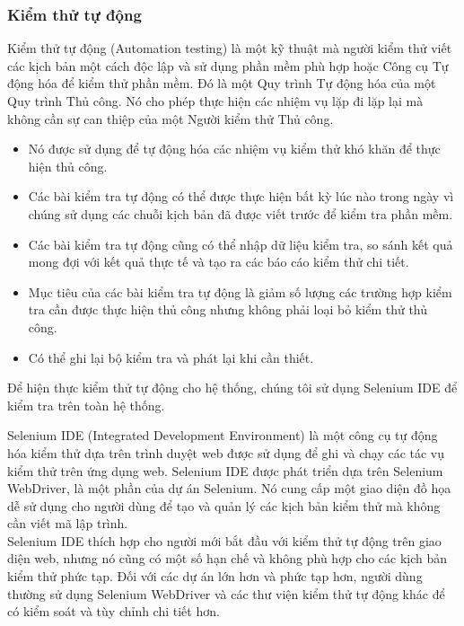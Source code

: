 \subsubsection{Kiểm thử tự động}

Kiểm thử tự động (Automation testing) là một kỹ thuật mà người kiểm thử viết các kịch bản một cách độc lập và sử dụng phần mềm phù hợp hoặc Công cụ Tự động hóa để kiểm thử phần mềm. Đó là một Quy trình Tự động hóa của một Quy trình Thủ công. Nó cho phép thực hiện các nhiệm vụ lặp đi lặp lại mà không cần sự can thiệp của một Người kiểm thử Thủ công.

\begin{itemize}
    \item Nó được sử dụng để tự động hóa các nhiệm vụ kiểm thử khó khăn để thực hiện thủ công.
    \item Các bài kiểm tra tự động có thể được thực hiện bất kỳ lúc nào trong ngày vì chúng sử dụng các chuỗi kịch bản đã được viết trước để kiểm tra phần mềm.
    \item Các bài kiểm tra tự động cũng có thể nhập dữ liệu kiểm tra, so sánh kết quả mong đợi với kết quả thực tế và tạo ra các báo cáo kiểm thử chi tiết.
    \item Mục tiêu của các bài kiểm tra tự động là giảm số lượng các trường hợp kiểm tra cần được thực hiện thủ công nhưng không phải loại bỏ kiểm thử thủ công.
    \item Có thể ghi lại bộ kiểm tra và phát lại khi cần thiết.
\end{itemize}

Để hiện thực kiểm thử tự động cho hệ thống, chúng tôi sử dụng Selenium IDE để kiểm tra trên toàn hệ thống.

Selenium IDE (Integrated Development Environment) là một công cụ tự động hóa kiểm thử dựa trên trình duyệt web được sử dụng để ghi và chạy các tác vụ kiểm thử trên ứng dụng web. Selenium IDE được phát triển dựa trên Selenium WebDriver, là một phần của dự án Selenium. Nó cung cấp một giao diện đồ họa dễ sử dụng cho người dùng để tạo và quản lý các kịch bản kiểm thử mà không cần viết mã lập trình.\\

Selenium IDE thích hợp cho người mới bắt đầu với kiểm thử tự động trên giao diện web, nhưng nó cũng có một số hạn chế và không phù hợp cho các kịch bản kiểm thử phức tạp. Đối với các dự án lớn hơn và phức tạp hơn, người dùng thường sử dụng Selenium WebDriver và các thư viện kiểm thử tự động khác để có kiểm soát và tùy chỉnh chi tiết hơn.

